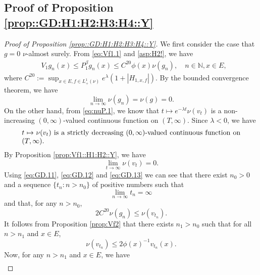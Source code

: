 \documentclass[12pt,a4paper]{amsart}
\numberwithin{equation}{section}
\theoremstyle{plain}
\theoremstyle{definition}
\theoremstyle{remark}
\begin{document}
\subsection{Proof of Proposition \ref{prop::GD:H1:H2:H3:H4::Y}}
\begin{proof}[Proof of Proposition \ref{prop::GD:H1:H2:H3:H4::Y}] \label{sec:GD}
	We first consider the case that $g = 0$ $\nu$-almost surely.
	From \eqref{eq:Vf1.1} and \eqref{asp:H2!}, we have
\begin{align}\label{eq:GD.1}
	&V_1 g_n(x)
	\leq P^\beta_1 g_n(x)
	\leq C^{20} \phi(x) \nu(g_n),
	\quad n \in \mathbb N, x\in E,
\end{align}
	where $C^{20} := \sup_{x\in E, f\in L_+^1(\nu)}e^{\lambda }(1+|H_{1,x,f}|)$.
	By the bounded convergence theorem, we have
\begin{equation} \label{eq:GD.11}
	\lim_{n\to \infty} \nu(g_n) = \nu(g) = 0.
\end{equation}
	On the other hand, from \eqref{eq:nuP.1}, we know that $ t\mapsto e^{-\lambda t}\nu(v_t)$ is a non-increasing $(0,\infty)$-valued continuous function on $(T,\infty)$.
	Since $\lambda <0$, we have
\begin{equation} \label{eq:GD.12}
\begin{minipage}{0.9\textwidth}
	$ t\mapsto \nu(v_t)$ is a strictly decreasing $(0,\infty)$-valued continuous function on $(T,\infty)$.
\end{minipage}
\end{equation}
	By Proposition \ref{prop:Vf1::H1:H2::Y}, we have
\begin{equation} \label{eq:GD.13}
	\lim_{t\to \infty}\nu(v_t) =0.
\end{equation}
	Using \eqref{eq:GD.11}, \eqref{eq:GD.12} and \eqref{eq:GD.13} we can see that there exist $n_0>0$ and a sequence $\{t_n: n>n_0\}$ of positive numbers such that
\begin{equation} \label{eq:GD.14}
	\lim_{n\to \infty} t_n = \infty
\end{equation}
	and that, for any $n>n_0$,
\begin{equation} \label{eq:GD.2}
2C^{20} \nu(g_n)
	\leq \nu(v_{t_n}).
\end{equation}
	It follows from Proposition \ref{prop:Vf2} that there exists $n_1 > n_0$ such that for all $n>n_1$ and $x\in E$,
\begin{equation} \label{eq:GD.25}
	\nu(v_{t_n})\leq 2\phi(x)^{-1} v_{t_n}(x).
\end{equation}
	Now, for any $n>n_1$ and $x\in E$, we have
\begin{align}

\end{align}
\end{proof}
\end{document}
